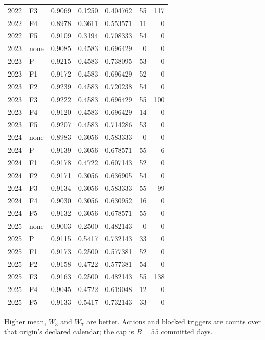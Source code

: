 \begin{table}[!tbp]
\begin{tabular}{@{}llrrrrr@{}}
2022 & F3 & 0.9069 & 0.1250 & 0.404762 & 55 & 117 \\
2022 & F4 & 0.8978 & 0.3611 & 0.553571 & 11 & 0 \\
2022 & F5 & 0.9109 & 0.3194 & 0.708333 & 54 & 0 \\
2023 & none & 0.9085 & 0.4583 & 0.696429 & 0 & 0 \\
2023 & P & 0.9215 & 0.4583 & 0.738095 & 53 & 0 \\
2023 & F1 & 0.9172 & 0.4583 & 0.696429 & 52 & 0 \\
2023 & F2 & 0.9239 & 0.4583 & 0.720238 & 54 & 0 \\
2023 & F3 & 0.9222 & 0.4583 & 0.696429 & 55 & 100 \\
2023 & F4 & 0.9120 & 0.4583 & 0.696429 & 14 & 0 \\
2023 & F5 & 0.9207 & 0.4583 & 0.714286 & 53 & 0 \\
2024 & none & 0.8983 & 0.3056 & 0.583333 & 0 & 0 \\
2024 & P & 0.9139 & 0.3056 & 0.678571 & 55 & 6 \\
2024 & F1 & 0.9178 & 0.4722 & 0.607143 & 52 & 0 \\
2024 & F2 & 0.9171 & 0.3056 & 0.636905 & 54 & 0 \\
2024 & F3 & 0.9134 & 0.3056 & 0.583333 & 55 & 99 \\
2024 & F4 & 0.9030 & 0.3056 & 0.630952 & 16 & 0 \\
2024 & F5 & 0.9132 & 0.3056 & 0.678571 & 55 & 0 \\
2025 & none & 0.9003 & 0.2500 & 0.482143 & 0 & 0 \\
2025 & P & 0.9115 & 0.5417 & 0.732143 & 33 & 0 \\
2025 & F1 & 0.9173 & 0.2500 & 0.577381 & 52 & 0 \\
2025 & F2 & 0.9158 & 0.4722 & 0.577381 & 54 & 0 \\
2025 & F3 & 0.9163 & 0.2500 & 0.482143 & 55 & 138 \\
2025 & F4 & 0.9045 & 0.4722 & 0.619048 & 12 & 0 \\
2025 & F5 & 0.9133 & 0.5417 & 0.732143 & 33 & 0 \\
\bottomrule
\end{tabular}
\par\footnotesize Higher mean, $W_3$ and $W_7$ are better. Actions and blocked triggers are counts over that origin's declared calendar; the cap is $B=55$ committed days.
\end{table}
